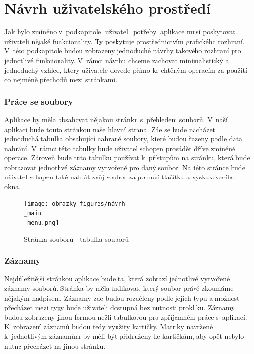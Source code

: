 \section{Návrh uživatelského prostředí}
Jak bylo zmíněno v~podkapitole \ref{uživatel_potřeby} aplikace musí poskytovat uživateli nějaké funkcionality. Ty poskytuje prostřednictvím grafického rozhraní. V~této podkapitole budou zobrazeny jednoduché návrhy takového rozhraní pro jednotlivé funkcionality. V~rámci návrhu chceme zachovat minimalistický a jednoduchý vzhled, který uživatele dovede přímo ke chtěným operacím za použití co nejméně přechodů mezi stránkami.

\subsubsection{Práce se soubory}
Aplikace by měla obsahovat nějakou stránku s~přehledem souborů. V~naší aplikaci bude touto stránkou naše hlavní strana. Zde se bude nacházet jednoduchá tabulka obsahující nahrané soubory, které budou řazeny podle data nahrání. V~rámci této tabulky bude uživatel schopen provádět dříve zmíněné operace. Zároveň bude tuto tabulku používat k~přístupům na stránku, která bude zobrazovat jednotlivé záznamy vytvořené pro daný soubor. 
Na této stránce bude uživatel schopen také nahrát svůj soubor za pomocí tlačítka a vyskakovacího okna.

\begin{figure}[H]
	\centering
	\texttt{[image: obrazky-figures/návrh\\\_main\\\_menu.png]}
	\caption[Návrh stránky souborů]{Stránka souborů - tabulka souborů}
	\label{figure_hlavní_stránka}
\end{figure}

\subsubsection{Záznamy}

Nejdůležitější stránkou aplikace bude ta, která zobrazí jednotlivé vytvořené záznamy souborů. Stránka by měla indikovat, který soubor právě zkoumáme nějakým nadpisem. Záznamy zde budou rozděleny podle jejich typu a možnost přecházet mezi typy bude uživateli dostupná bez nutnosti prokliku. Záznamy budou zobrazeny jinou formou nežli tabulkovou pro zpříjemnění práce s~aplikací. K~zobrazení záznamů budou tedy využity kartičky. Matriky navržené k~jednotlivým záznamům by měli být přidruženy ke kartičkám, aby opět nebylo nutné přecházet na jinou stránku.

